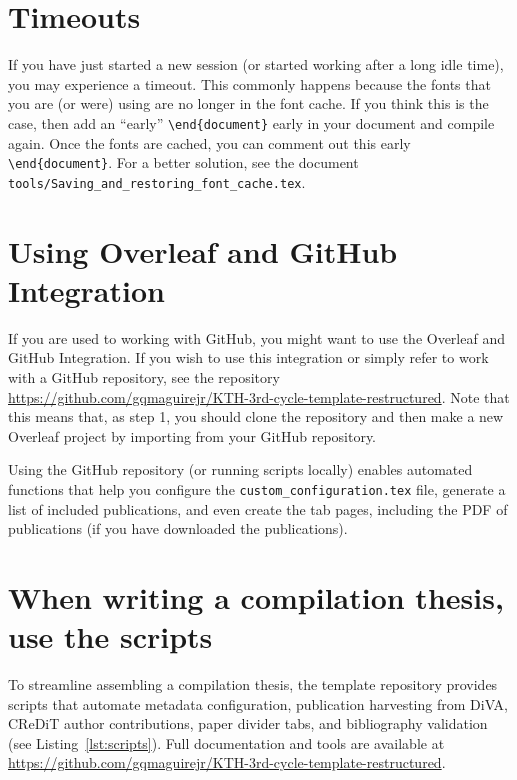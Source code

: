 \documentclass{article}
\newcommand{\fname}[1]{\texttt{#1}}
\begin{document}
\section*{Timeouts}
If you have just started a new session (or started working after a long idle time), you may experience a timeout. This commonly happens because the fonts that you are (or were) using are no longer in the font cache. If you think this is the case, then add an \enquote{early} \texttt{\textbackslash end\{document\}} early in your document and compile again. Once the fonts are cached, you can comment out this early \texttt{\textbackslash end\{document\}}. For a better solution, see the document \fname{tools/Saving\_and\_restoring\_font\_cache.tex}.

\section*{Using Overleaf and GitHub Integration}
If you are used to working with GitHub, you might want to use the Overleaf and GitHub Integration. 
If you wish to use this integration or simply refer to work with a GitHub repository, see the repository \url{https://github.com/gqmaguirejr/KTH-3rd-cycle-template-restructured}.
Note that this means that, as step 1, you should clone the repository and then make a new Overleaf project by importing from your GitHub repository.

Using the GitHub repository (or running scripts locally) enables automated functions that help you configure the \fname{custom\_configuration.tex} file, generate a list of included publications, and even create the tab pages, including the PDF of publications (if you have downloaded the publications).

\section*{When writing a compilation thesis, use the scripts}
To streamline assembling a compilation thesis, the template repository provides scripts that automate metadata configuration, publication harvesting from DiVA, CReDiT author contributions, paper divider tabs, and bibliography validation (see Listing~\ref{lst:scripts}). Full documentation and tools are available at \url{https://github.com/gqmaguirejr/KTH-3rd-cycle-template-restructured}.
\end{document}

